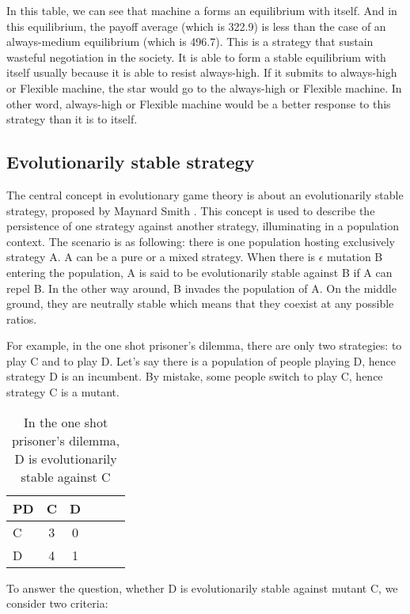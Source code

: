 \documentclass[12.5pt]{report}
\begin{document}
In this table, we can see that machine a forms an equilibrium with itself. And in this equilibrium, the payoff average (which is 322.9) is less than the case of an always-medium equilibrium (which is 496.7). This is a strategy that sustain wasteful negotiation in the society. It is able to form a stable equilibrium with itself usually because it is able to resist always-high. If it submits to always-high or Flexible machine, the star would go to the always-high or Flexible machine. In other word, always-high or Flexible machine would be a better response to this strategy than it is to itself.\\

\subsection{Evolutionarily stable strategy}

The central concept in evolutionary game theory is about an evolutionarily stable strategy, proposed by Maynard Smith \cite{maynard}. This concept is used to describe the persistence of one strategy against another strategy, illuminating in a population context. The scenario is as following: there is one population hosting exclusively strategy A. A can be a pure or a mixed strategy. When there is $\epsilon$ mutation B entering the population, A is said to be evolutionarily stable against B if A can repel B. In the other way around, B invades the population of A. On the middle ground, they are neutrally stable which means that they coexist at any possible ratios.

For example, in the one shot prisoner's dilemma, there are only two strategies: to play C and to play D. Let's say there is a population of people playing D, hence strategy D is an incumbent. By mistake, some people switch to play C, hence strategy C is a mutant.

\begin{table}[h!]
\center
\begin{tabular}{l|ccccc}
\textbf{PD}& C & D \\
\hline
C & 3 &  0   \\
D &  4  & 1   \\
\end{tabular}
\caption{In the one shot prisoner's dilemma, D is evolutionarily stable against C}
\end{table}

To answer the question, whether D is evolutionarily stable against mutant C, we consider two criteria:
\end{document}
